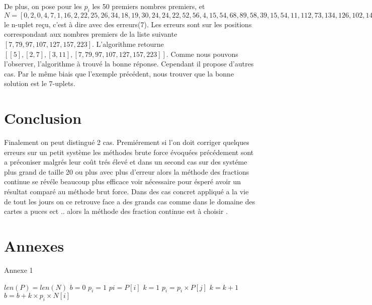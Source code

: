 \documentclass[a4paper, 11pt]{report}
\begin{document}
De plus, on pose pour les $p_i$ les 50 premiers nombres premiers, et $N=[0, 2, 0, 4, 7, 1, 16, 2, 22, 25, 26, 34, 18, 19, 30, 24, 24, 22, 52, 56, 4, 15, 54, 68, 89, 58, 39, 15, 54, 11, 112, 73, 134, 126, 102, 142, 142, 92, 159, 48, 119, 33, 16, 77, 28, 29, 67, 89, 86, 163, 150]$ le n-uplet reçu, c'est à dire avec des erreurs(7). 
Les erreurs sont sur les positions correspondant aux nombres premiers de la liste suivante $[7, 79, 97, 107, 127, 157, 223]$. 
L'algorithme retourne $[[5], [2, 7], [3, 11], [7, 79, 97, 107, 127, 157, 223]]$. Comme nous pouvons l'observer, l'algorithme à trouvé la bonne réponse. Cependant il propose d'autres cas. Par le même biais que l'exemple précédent, nous trouver que la bonne solution est le 7-uplets.


\newpage
 
\chapter*{Conclusion}
Finalement on peut distingué 2 cas. Premiérement si l'on doit corriger quelques erreurs sur un petit système 
les méthodes brute force évoquées précédement sont a préconiser malgrés leur coût trés élevé
et dans un second cas sur des systéme plus grand de taille 20 ou plus avec plus d'erreur alors la méthode des fractions continue
se révéle beaucoup plus efficace voir nécessaire pour ésperé avoir un résultat comparé au méthode brut force.
Dans des cas concret appliqué a la vie de tout les jours on ce retrouve face a des grands cas comme dans le domaine des cartes a puces ect ..
alors la méthode des fraction continue est à choisir .
\newpage

\chapter*{Annexes}
\begin{appendices}
    Annexe 1
    \begin{algorithm}
        \caption{algorithme du théorème des restes chinois}
        \begin{algorithmic}
            \REQUIRE $len(P)=len(N)$
            \STATE $b=0$
            \STATE $p_i=1$
            \STATE $pi=P[i]$
            \STATE $k=1$
            \STATE $p_i=p_i\times P[j]$
            \ENDIF
            \ENDFOR
            \STATE $k=k+1$
            \ENDWHILE
            \STATE $b=b+k\times p_i \times N[i] $
            \ENDFOR
        \end{algorithmic}
    \end{algorithm}
\end{appendices}
\end{document}
